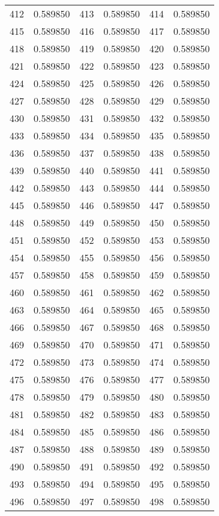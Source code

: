 \documentclass[12pt]{article}
\begin{document}
\begin{longtable}{@{}cc|cc|cc@{}}
412 & 0.589850 & 413 & 0.589850 & 414 & 0.589850 \\
415 & 0.589850 & 416 & 0.589850 & 417 & 0.589850 \\
418 & 0.589850 & 419 & 0.589850 & 420 & 0.589850 \\
421 & 0.589850 & 422 & 0.589850 & 423 & 0.589850 \\
424 & 0.589850 & 425 & 0.589850 & 426 & 0.589850 \\
427 & 0.589850 & 428 & 0.589850 & 429 & 0.589850 \\
430 & 0.589850 & 431 & 0.589850 & 432 & 0.589850 \\
433 & 0.589850 & 434 & 0.589850 & 435 & 0.589850 \\
436 & 0.589850 & 437 & 0.589850 & 438 & 0.589850 \\
439 & 0.589850 & 440 & 0.589850 & 441 & 0.589850 \\
442 & 0.589850 & 443 & 0.589850 & 444 & 0.589850 \\
445 & 0.589850 & 446 & 0.589850 & 447 & 0.589850 \\
448 & 0.589850 & 449 & 0.589850 & 450 & 0.589850 \\
451 & 0.589850 & 452 & 0.589850 & 453 & 0.589850 \\
454 & 0.589850 & 455 & 0.589850 & 456 & 0.589850 \\
457 & 0.589850 & 458 & 0.589850 & 459 & 0.589850 \\
460 & 0.589850 & 461 & 0.589850 & 462 & 0.589850 \\
463 & 0.589850 & 464 & 0.589850 & 465 & 0.589850 \\
466 & 0.589850 & 467 & 0.589850 & 468 & 0.589850 \\
469 & 0.589850 & 470 & 0.589850 & 471 & 0.589850 \\
472 & 0.589850 & 473 & 0.589850 & 474 & 0.589850 \\
475 & 0.589850 & 476 & 0.589850 & 477 & 0.589850 \\
478 & 0.589850 & 479 & 0.589850 & 480 & 0.589850 \\
481 & 0.589850 & 482 & 0.589850 & 483 & 0.589850 \\
484 & 0.589850 & 485 & 0.589850 & 486 & 0.589850 \\
487 & 0.589850 & 488 & 0.589850 & 489 & 0.589850 \\
490 & 0.589850 & 491 & 0.589850 & 492 & 0.589850 \\
493 & 0.589850 & 494 & 0.589850 & 495 & 0.589850 \\
496 & 0.589850 & 497 & 0.589850 & 498 & 0.589850 \\

\end{longtable}
\end{document}
